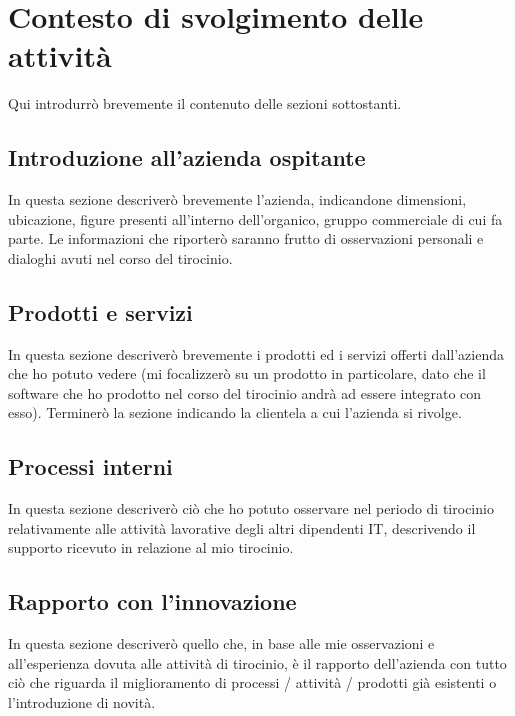 \chapter{Contesto di svolgimento delle attività}
\label{cap:contesto-svolgimento}
Qui introdurrò brevemente il contenuto delle sezioni sottostanti.

\section{Introduzione all'azienda ospitante}

In questa sezione descriverò brevemente l'azienda, indicandone dimensioni, ubicazione, figure presenti all'interno dell'organico, gruppo commerciale di cui fa parte.
Le informazioni che riporterò saranno frutto di osservazioni personali e dialoghi avuti nel corso del tirocinio.

\section{Prodotti e servizi}

In questa sezione descriverò brevemente i prodotti ed i servizi offerti dall'azienda che ho potuto vedere (mi focalizzerò su un prodotto in particolare, dato che il software che ho prodotto nel corso del tirocinio andrà ad essere integrato con esso).
Terminerò la sezione indicando la clientela a cui l'azienda si rivolge.

\section{Processi interni}

In questa sezione descriverò ciò che ho potuto osservare nel periodo di tirocinio relativamente alle attività lavorative degli altri dipendenti IT, descrivendo il supporto ricevuto in relazione al mio tirocinio.


\section{Rapporto con l'innovazione}

In questa sezione descriverò quello che, in base alle mie osservazioni e all'esperienza dovuta alle attività di tirocinio, è il rapporto dell'azienda con tutto ciò che riguarda il miglioramento di processi / attività / prodotti già esistenti o l'introduzione di novità.